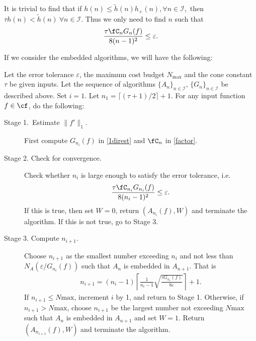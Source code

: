 It is trivial to find that if $h(n) \leq \tilde{h}(n) h_{+}(n), \forall n \in \mathcal{I},$ then $ \tau h(n)< \tilde{h}(n) \ \forall n \in \mathcal{I}.$
Thus we only need to find $n$ such that
\[
\frac{\tau \fC_n G_{n}(f)}{8(n-1)^2} \le \varepsilon.
\]
 
If we consider the embedded algorithms, we will have the following:
\begin{algo} \label{multistageintegalgo}
 Let the error tolerance $\varepsilon$, the maximum cost budget $N_{\text{max}}$ and the cone constant $\tau$ be given inputs. Let the sequence of algorithms $\{A_n\}_{n\in \mathcal{I}}$, $\{G_n\}_{n\in \mathcal{I}}$ be described above. Set $i=1$. Let $n_1=\lceil(\tau+1)/2\rceil+1$. For any input function $f\in\cf$, do the following:
\begin{description}
\item[Stage 1.\ Estimate {$\|f'\|_{1}$}.] First compute $G_{n_i}(f)$ in \eqref{1direst} and $\fC_n$ in \eqref{factor}.

\item[Stage 2. Check for convergence.] Check whether $n_i$ is large enough to satisfy the error tolerance, i.e.
    \begin{align*}
      \frac{\tau \fC_{n_i} G_{n_i}(f)}{8(n_i-1)^2} \le \varepsilon.
    \end{align*}
    If this is true, then set $W=0$, return $(A_{n_i}(f),W)$ and terminate the algorithm. If this is not true, go to Stage 3.

\item[Stage 3. Compute $n_{i+1}$.] Choose $n_{i+1}$ as the smallest number exceeding $n_i$ and not less than $N_A(\varepsilon/G_{n_i}(f))$ such that $A_n$ is embedded in $A_{n+1}$. That is
    \begin{align*}
      n_{i+1}=(n_i-1)\left\lceil\frac{1}{n_{i}-1}\sqrt{\frac{\tau G_{n_i}(f)}{8\varepsilon}}\right\rceil+1.
    \end{align*}
    If $n_{i+1}\leq N{\text{max}}$, increment $i$ by 1, and return to Stage 1. Otherwise, if $n_{i+1}> N{\text{max}}$, choose $n_{i+1}$ be the largest number not exceeding $N{\text{max}}$ such that $A_n$ is embedded in $A_{n+1}$ and set $W=1$. Return $(A_{n_{i+1}}(f),W)$ and terminate the algorithm.
\end{description}
\end{algo}

